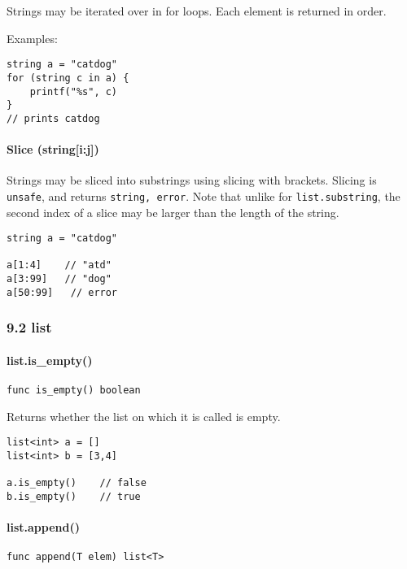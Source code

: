 Strings may be iterated over in for loops. Each element is returned in
order.

Examples:

\begin{verbatim}
string a = "catdog"
for (string c in a) {
    printf("%s", c)
}
// prints catdog
\end{verbatim}

\paragraph{Slice (string{[}i:j{]})}\label{slice-stringij}

Strings may be sliced into substrings using slicing with brackets.
Slicing is \texttt{unsafe}, and returns \texttt{string, error}. Note
that unlike for \texttt{list.substring}, the second index of a slice may
be larger than the length of the string.

\begin{verbatim}
string a = "catdog"

a[1:4]    // "atd"
a[3:99]   // "dog"
a[50:99]   // error
\end{verbatim}

\subsubsection{9.2 list}\label{list-1}

\paragraph{list.is\_empty()}\label{list.isux5fempty}

\begin{verbatim}
func is_empty() boolean
\end{verbatim}

Returns whether the list on which it is called is empty.

\begin{verbatim}
list<int> a = []
list<int> b = [3,4]

a.is_empty()    // false
b.is_empty()    // true
\end{verbatim}

\paragraph{list.append()}\label{list.append}

\begin{verbatim}
func append(T elem) list<T>
\end{verbatim}

